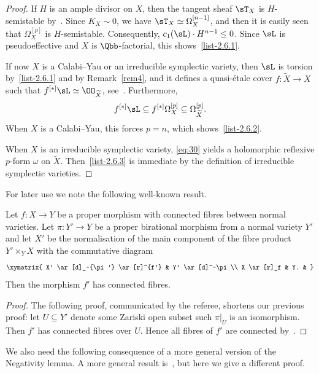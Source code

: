 \begin{proof}
If $H$ is an ample divisor on $X$, then the tangent sheaf $\sT_X$ is $H$-semistable by~\cite[Proposition~5.4]{GKP16}. Since $K_X\sim0$, we have $\sT_X\simeq\Omega_X^{[n-1]}$, and then it is easily seen that $\Omega^{[p]}_X$ is $H$-semistable. Consequently, $c_1(\sL) \cdot H^{n-1} \leq 0$. Since $\sL$ is pseudoeffective and $X$ is $\Qbb$-factorial, this shows~\eqref{list-2.6.1}.

If now $X$ is a Calabi--Yau or an irreducible symplectic variety, then $\sL$ is torsion by~\eqref{list-2.6.1} and by Remark~\ref{rem4}, and it defines a quasi-étale cover $f\colon \widetilde X \to X$ such that $f^{[*]}\sL\simeq\OO_{\widetilde X}$, see~\cite[Lemma~2.53]{KM98}. Furthermore,
\begin{equation}\label{eq:30}
f^{[*]}\sL \subseteq f^{[*]}\Omega^{[p]}_X \subseteq \Omega^{[p]}_{\widetilde X}.
\end{equation}
When $X$ is a Calabi--Yau, this forces $p = n$, which shows~\eqref{list-2.6.2}.

When $X$ is an irreducible symplectic variety, \eqref{eq:30} yields a holomorphic reflexive $p$-form $\omega $ on $\widetilde X$. Then~\eqref{list-2.6.3} is immediate by the definition of irreducible symplectic varieties.
\end{proof}

For later use we note the following well-known result.

\begin{lemm}\label{lem4}
Let $f\colon X\to Y$ be a proper morphism with connected fibres between normal varieties. Let $\pi\colon Y'\to Y$ be a proper birational morphism from a normal variety $Y'$ and let $X'$ be the normalisation of the main component of the fibre product $Y'\times_Y X$ with the commutative diagram
\[
\xymatrix{ X' \ar[d]_-{\pi'} \ar[r]^{f'} & Y' \ar[d]^-\pi \\ 
X \ar[r]_f & Y. & }
\]
Then the morphism $f'$ has connected fibres.
\end{lemm}

\begin{proof}
The following proof, communicated by the referee, shortens our previous proof: let $U \subseteq Y'$ denote some Zariski open subset such $\pi|_U$ is an isomorphism. Then $f'$ has connected fibres over $U$. Hence all fibres of $f'$ are connected by~\cite[Corollary~1.12]{Ue75}.
\end{proof}

We also need the following consequence of a more general version of the Negativity lemma. A more general result is~\cite[Corollary~13]{KL09}, but here we give a different proof.

